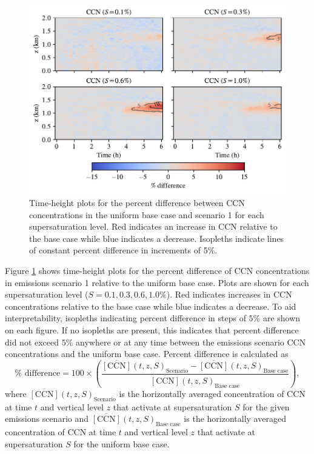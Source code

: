 \begin{figure}[!t]
  \centering
    \includegraphics[width=\textwidth]{figures/chapter5/height-time-ccn-pdiff-fx1fy0.pdf}
    \caption{Time-height plots for the percent difference between CCN concentrations in the uniform base case and scenario 1 for each supersaturation level. Red indicates an increase in CCN relative to the base case while blue indicates a decrease. Isopleths indicate lines of constant percent difference in increments of 5\%.}
    \label{fig:ht-ccn-pdiff-s1}
\end{figure}

Figure \ref{fig:ht-ccn-pdiff-s1} shows time-height plots for the percent difference of CCN concentrations in emissions scenario 1 relative to the uniform base case. Plots are shown for each supersaturation level ($S=0.1, 0.3, 0.6, 1.0\%$). Red indicates increases in CCN concentrations relative to the base case while blue indicates a decrease. To aid interpretability, isopleths indicating percent difference in steps of $5\%$ are shown on each figure. If no isopleths are present, this indicates that percent difference did not exceed $5\%$ anywhere or at any time between the emissions scenario CCN concentrations and the uniform base case. Percent difference is calculated as 
\begin{equation}
    \% \text{ difference} = 100\times\left(\frac{\overline{[\text{CCN}]}(t, z, S)_{\text{Scenario}} - \overline{[\text{CCN}]}(t, z, S)_{\text{Base case}}}{\overline{[\text{CCN}]}(t, z, S)_{\text{Base case}}}\right),
\end{equation}
where $\overline{[\text{CCN}]}(t, z,S)_{\text{Scenario}}$ is the horizontally averaged concentration of CCN at time $t$ and vertical level $z$ that activate at supersaturation $S$ for the given emissions scenario and $\overline{[\text{CCN}]}(t, z, S)_{\text{Base case}}$ is the horizontally averaged concentration of CCN at time $t$ and vertical level $z$ that activate at supersaturation $S$ for the uniform base case.

